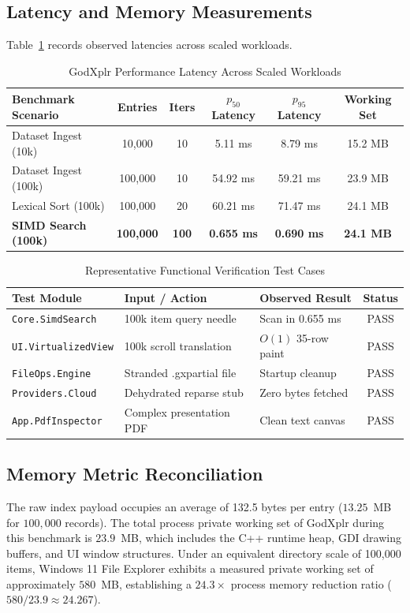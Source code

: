 \documentclass[conference]{IEEEtran}
\begin{document}
\subsection{Latency and Memory Measurements}
Table~\ref{tab:benchmarks} records observed latencies across scaled workloads.

\begin{table}[htbp]
\caption{GodXplr Performance Latency Across Scaled Workloads}
\label{tab:benchmarks}
\centering
\begin{tabular}{lccccc}
\toprule
\textbf{Benchmark Scenario} & \textbf{Entries} & \textbf{Iters} & \textbf{$p_{50}$ Latency} & \textbf{$p_{95}$ Latency} & \textbf{Working Set} \\
\midrule
Dataset Ingest (10k) & 10,000 & 10 & 5.11 ms & 8.79 ms & 15.2 MB \\
Dataset Ingest (100k) & 100,000 & 10 & 54.92 ms & 59.21 ms & 23.9 MB \\
Lexical Sort (100k) & 100,000 & 20 & 60.21 ms & 71.47 ms & 24.1 MB \\
\textbf{SIMD Search (100k)} & \textbf{100,000} & \textbf{100} & \textbf{0.655 ms} & \textbf{0.690 ms} & \textbf{24.1 MB} \\
\bottomrule
\end{tabular}
\end{table}

\begin{table}[htbp]
\caption{Representative Functional Verification Test Cases}
\label{tab:test_cases}
\centering
\begin{tabular}{p{2.2cm}p{2.3cm}p{1.8cm}c}
\toprule
\textbf{Test Module} & \textbf{Input / Action} & \textbf{Observed Result} & \textbf{Status} \\
\midrule
\texttt{Core.SimdSearch} & 100k item query needle & Scan in 0.655 ms & PASS \\
\texttt{UI.VirtualizedView} & 100k scroll translation & $O(1)$ 35-row paint & PASS \\
\texttt{FileOps.Engine} & Stranded .gxpartial file & Startup cleanup & PASS \\
\texttt{Providers.Cloud} & Dehydrated reparse stub & Zero bytes fetched & PASS \\
\texttt{App.PdfInspector} & Complex presentation PDF & Clean text canvas & PASS \\
\bottomrule
\end{tabular}
\end{table}

\subsection{Memory Metric Reconciliation}
The raw index payload occupies an average of 132.5 bytes per entry ($13.25$~MB for $100,000$ records). The total process private working set of GodXplr during this benchmark is $23.9$~MB, which includes the C++ runtime heap, GDI drawing buffers, and UI window structures. Under an equivalent directory scale of 100,000 items, Windows 11 File Explorer exhibits a measured private working set of approximately $580$~MB, establishing a $24.3\times$ process memory reduction ratio ($580 / 23.9 \approx 24.267$).
\end{document}
